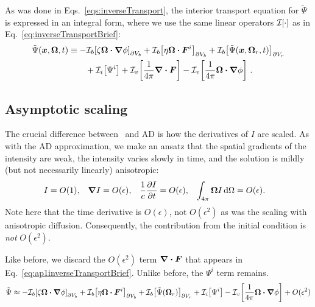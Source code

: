 As was done in Eqs.~\eqref{eqs:inverseTransport}, the interior transport
equation for $\tilde\Psi$ is expressed in an integral form, where we use the
same linear operators $\mathcal{I}_{}\!\left[\cdot\right]$ as in
Eq.~\eqref{eq:inverseTransportBrief}:
\begin{align}\label{eq:ap1inverseTransportBrief}
  \begin{split}
    \tilde\Psi(\bm{x}, \bm{\Omega}, t)
    &\equiv
    -\mathcal{I}_{b}\!\left[\zeta \bm{\Omega}\bm{\cdot} \bm{\nabla} \phi\right]_{\partial V_b}
    +\mathcal{I}_{b}\!\left[\eta \bm{\Omega}\bm{\cdot} \bm{F}^i\right]_{\partial V_b}
    + \mathcal{I}_{b}\!\left[\tilde\Psi(\bm{x}, \bm{\Omega}_r, t)\right]_{\partial V_r}
  \\&\qquad
    + \mathcal{I}_{i}\!\left[\Psi^i\right]
    + \mathcal{I}_{v}\!\left[\frac{1}{4\pi} \bm{\nabla} \bm{\cdot}\bm{F} \right]
    - \mathcal{I}_{v}\!\left[\frac{1}{4\pi} \bm{\Omega}\bm{\cdot} \bm{\nabla} \phi\right]
    \,.
  \end{split}
\end{align}

\subsection{Asymptotic scaling}

The crucial difference between \APone\ and AD is how the derivatives of $I$ are
scaled.
As with the AD approximation, we make an ansatz that the spatial gradients of
the intensity are weak, the intensity varies slowly in time, and the solution is
mildly (but not necessarily linearly) anisotropic:
\begin{align} \label{eq:ap1ansatz}
  I &= O(1), &
  \bm{\nabla} I &= O(\epsilon), &
  \frac{1}{c}\frac{\partial I}{\partial t} &= O(\epsilon), &
  \int_{4\pi} \bm{\Omega} I\mathop{}\!\mathrm{d}\Omega &= O(\epsilon).
\end{align}
Note here that the time derivative is $O(\epsilon)$, not
$O(\epsilon^2)$ as was the scaling with anisotropic diffusion. Consequently, the
contribution from the initial condition is \emph{not} $O(\epsilon^2)$.

Like before, we discard the $O(\epsilon^2)$ term $\bm{\nabla} \bm{\cdot}\bm{F}$ that appears in
Eq.~\eqref{eq:ap1inverseTransportBrief}. Unlike before, the $\Psi^i$ term
remains.
\begin{equation} \label{eq:ap1approxPsi1}
  \tilde\Psi \approx 
  -\mathcal{I}_{b}\!\left[\zeta \bm{\Omega}\bm{\cdot} \bm{\nabla} \phi\right]_{\partial V_b}
  + \mathcal{I}_{b}\!\left[\eta \bm{\Omega}\bm{\cdot} \bm{F}^i\right]_{\partial V_b}
  + \mathcal{I}_{b}\!\left[\tilde\Psi(\bm{\Omega}_r)\right]_{\partial V_r}
  + \mathcal{I}_{i}\!\left[\Psi^i\right]
  - \mathcal{I}_{v}\!\left[\frac{1}{4\pi} \bm{\Omega}\bm{\cdot} \bm{\nabla} \phi\right]
  + O(\epsilon^2)
\end{equation}

